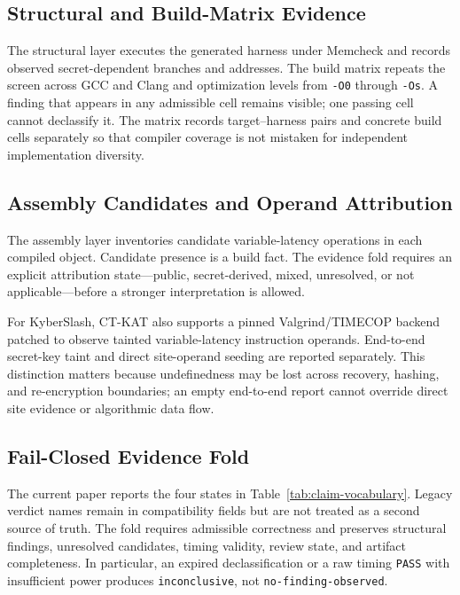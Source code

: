 \documentclass[cryptography,article,submit,moreauthors]{Definitions/mdpi}
\newcommand{\evidence}[1]{\texttt{#1}}
\begin{document}
\subsection{Structural and Build-Matrix Evidence}

The structural layer executes the generated harness under Memcheck and records
observed secret-dependent branches and addresses. The build matrix repeats the
screen across GCC and Clang and optimization levels from \texttt{-O0} through
\texttt{-Os}. A finding that appears in any admissible cell remains visible;
one passing cell cannot declassify it. The matrix records target--harness pairs
and concrete build cells separately so that compiler coverage is not mistaken
for independent implementation diversity.

\subsection{Assembly Candidates and Operand Attribution}

The assembly layer inventories candidate variable-latency operations in each
compiled object. Candidate presence is a build fact. The evidence fold requires
an explicit attribution state---public, secret-derived, mixed, unresolved, or
not applicable---before a stronger interpretation is allowed.

For KyberSlash, CT-KAT also supports a pinned Valgrind/TIMECOP backend patched
to observe tainted variable-latency instruction operands. End-to-end secret-key
taint and direct site-operand seeding are reported separately. This distinction
matters because undefinedness may be lost across recovery, hashing, and
re-encryption boundaries; an empty end-to-end report cannot override direct
site evidence or algorithmic data flow.

\subsection{Fail-Closed Evidence Fold}

The current paper reports the four states in Table~\ref{tab:claim-vocabulary}.
Legacy verdict names remain in compatibility fields but are not treated as a
second source of truth. The fold requires admissible correctness and preserves
structural findings, unresolved candidates, timing validity, review state, and
artifact completeness. In particular, an expired declassification or a raw
timing \texttt{PASS} with insufficient power produces \evidence{inconclusive},
not \evidence{no-finding-observed}.
\end{document}
